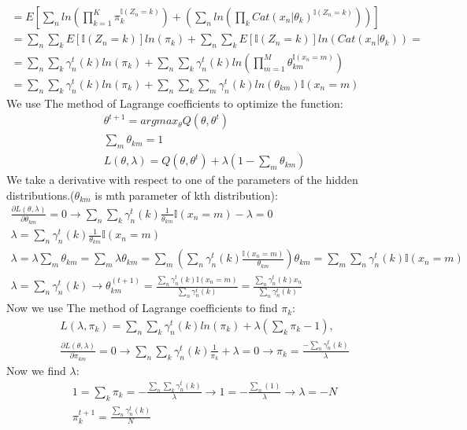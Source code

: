 \documentclass[12pt]{article}
\begin{document}
\begin{qsolve}
\begin{gather*}
        =E[\sum_nln(\prod_{k=1}^K\pi_k^{\mathbb{I}(Z_n=k)})+(\sum_nln(\prod_kCat(x_n|\theta_k)^{\mathbb{I}(Z_n=k)}))] \\
        =\sum_n\sum_kE[{\mathbb{I}(Z_n=k)}]ln(\pi_k)+\sum_n\sum_kE[{\mathbb{I}(Z_n=k)}]ln(Cat(x_n|\theta_k)) = \\
        =\sum_n\sum_k\gamma_n^t(k)ln(\pi_k)+\sum_n\sum_k\gamma_n^t(k)ln(\prod_{m=1}^{M}\theta_{km}^{\mathbb{I}(x_n=m)}) \\
        =\sum_n\sum_k\gamma_n^t(k)ln(\pi_k)+\sum_n\sum_k\sum_m\gamma_n^t(k)ln(\theta_{km})\mathbb{I}(x_n=m)
    \end{gather*}
    We use The method of Lagrange coefficients to optimize the function:
    \begin{gather*}
        \theta^{t+1}=argmax_\theta Q(\theta,\theta^t)\\
        \sum_m\theta_{km}=1\\
        L(\theta,\lambda)=Q(\theta,\theta^t)+\lambda(1-\sum_m\theta_{km})
    \end{gather*}
    \splitqsolve
    We take a derivative with respect to one of the parameters of the hidden distributions.($\theta_{km}$ is mth parameter of kth distribution):
    \begin{gather*}
        \frac{\partial L(\theta,\lambda)}{\partial \theta_{km}}=0\rightarrow\sum_n\sum_k\gamma_n^t(k)\frac{1}{\theta_{km}}\mathbb{I}(x_n=m)-\lambda=0
        \\\lambda=\sum_n\gamma_n^t(k)\frac{1}{\theta_{km}}\mathbb{I}(x_n=m)
        \\\lambda=\lambda\sum_{m}\theta_{km}=\sum_{m}\lambda\theta_{km}=\sum_m(\sum_n\gamma_n^t(k)\frac{\mathbb{I}(x_n=m)}{\theta_{km}})\theta_{km}=\sum_m\sum_n\gamma_n^t(k)\mathbb{I}(x_n=m)
        \\\lambda=\sum_n\gamma_n^t(k)\rightarrow\theta_{km}^(t+1)=\frac{\sum_n\gamma_n^t(k)\mathbb{I}(x_n=m)}{\sum_n\gamma_n^t(k)}=\frac{\sum_n\gamma_n^t(k)x_n}{\sum_n\gamma_n^t(k)}
    \end{gather*}
    Now we use The method of Lagrange coefficients to find $\pi_k$:
    \begin{gather*}
        L(\lambda,\pi_k)=\sum_n\sum_k\gamma_n^t(k)ln(\pi_k)+\lambda(\sum_k\pi_k-1),\\
        \frac{\partial L(\theta,\lambda)}{\partial \pi_{km}}=0\rightarrow\sum_n\sum_k\gamma_n^t(k)\frac{1}{\pi_k}+\lambda=0\rightarrow\pi_k=\frac{-\sum_n\gamma_n^t(k)}{\lambda}
    \end{gather*}
    Now we find $\lambda$:
    \begin{gather*}
        1=\sum_k\pi_k=-\frac{\sum_n\sum_k\gamma_n^t(k)}{\lambda}\rightarrow1=-\frac{\sum_n(1)}{\lambda}\rightarrow\lambda=-N\\
        \pi_k^{t+1}=\frac{\sum_n\gamma_n^t(k)}{N}
    \end{gather*}
\end{qsolve}
\end{document}
